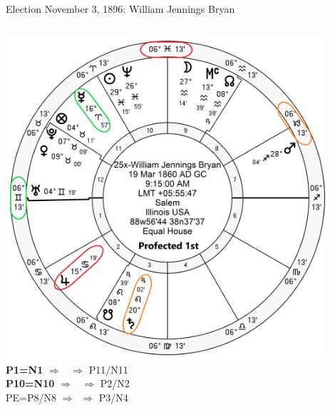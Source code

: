 \begin{frame}[t]{Election November 3, 1896: William Jennings Bryan}
\begin{columns}[T, onlytextwidth]
\vspace{-1em}
{\includegraphics[width=0.9\textwidth]{charts/Bryan-Prof-1st.png}}
\textbf{\dgreen P1=N1} 
	$\Rightarrow$ \Mercury\, $\Rightarrow$ P11/N11\\
\textbf{\red P10=N10}
	$\Rightarrow$ \Jupiter\, $\Rightarrow$ P2/N2\\
PE=P8/N8 
	$\Rightarrow$ \Saturn\,\Retrograde $\Rightarrow$ P3/N4
\end{columns}
\end{frame}
